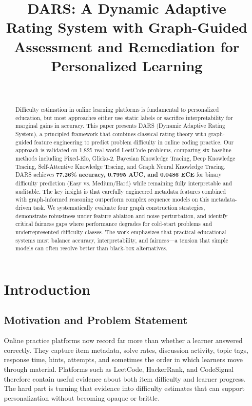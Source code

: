 \documentclass[conference]{IEEEtran}
\title{DARS: A Dynamic Adaptive Rating System with Graph-Guided Assessment and Remediation for Personalized Learning}
\author{\IEEEauthorblockN{Khethavath Sunil Naik}\\
\IEEEauthorblockA{BTech Project, India}}
\begin{document}
\maketitle

\begin{abstract}
Difficulty estimation in online learning platforms is fundamental to personalized education, but most approaches either use static labels or sacrifice interpretability for marginal gains in accuracy. This paper presents DARS (Dynamic Adaptive Rating System), a principled framework that combines classical rating theory with graph-guided feature engineering to predict problem difficulty in online coding practice. Our approach is validated on 1,825 real-world LeetCode problems, comparing six baseline methods including Fixed-Elo, Glicko-2, Bayesian Knowledge Tracing, Deep Knowledge Tracing, Self-Attentive Knowledge Tracing, and Graph Neural Knowledge Tracing. DARS achieves \textbf{77.26\% accuracy, 0.7995 AUC, and 0.0486 ECE} for binary difficulty prediction (Easy vs. Medium/Hard) while remaining fully interpretable and auditable. The key insight is that carefully engineered metadata features combined with graph-informed reasoning outperform complex sequence models on this metadata-driven task. We systematically evaluate four graph construction strategies, demonstrate robustness under feature ablation and noise perturbation, and identify critical fairness gaps where performance degrades for cold-start problems and underrepresented difficulty classes. The work emphasizes that practical educational systems must balance accuracy, interpretability, and fairness—a tension that simple models can often resolve better than black-box alternatives.
\end{abstract}

\section{Introduction}

\subsection{Motivation and Problem Statement}

Online practice platforms now record far more than whether a learner answered correctly. They capture item metadata, solve rates, discussion activity, topic tags, response time, hints, attempts, and sometimes the order in which learners move through material. Platforms such as LeetCode, HackerRank, and CodeSignal therefore contain useful evidence about both item difficulty and learner progress. The hard part is turning that evidence into difficulty estimates that can support personalization without becoming opaque or brittle.
\end{document}
